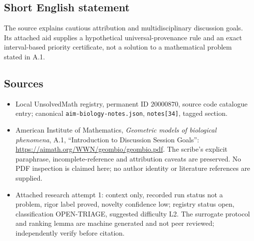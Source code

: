 \documentclass[11pt]{article}
\begin{document}
\subsection{Short English statement}
The source explains cautious attribution and multidisciplinary discussion goals. Its attached aid supplies a hypothetical universal-provenance rule and an exact interval-based priority certificate, not a solution to a mathematical problem stated in A.1.
\subsection{Sources}
\begin{itemize}
\item Local UnsolvedMath registry, permanent ID $20000870$, source code catalogue entry; canonical \texttt{aim-biology-notes.json}, \texttt{notes[34]}, tagged section.
\item American Institute of Mathematics, \emph{Geometric models of biological phenomena}, A.1, ``Introduction to Discussion Session Goals'': \url{https://aimath.org/WWN/geombio/geombio.pdf}. The scribe's explicit paraphrase, incomplete-reference and attribution caveats are preserved. No PDF inspection is claimed here; no author identity or literature references are supplied.
\item Attached research attempt 1: context only, recorded run status not a problem, rigor label proved, novelty confidence low; registry status open, classification OPEN-TRIAGE, suggested difficulty L2. The surrogate protocol and ranking lemma are machine generated and not peer reviewed; independently verify before citation.
\end{itemize}
\end{document}
